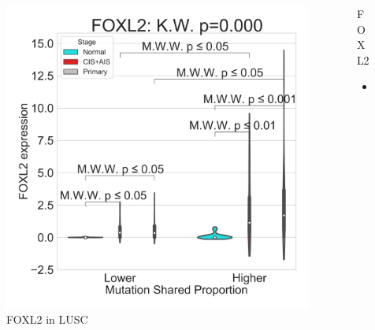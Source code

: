 \documentclass{beamer}
\begin{document}
\begin{frame}[allowframebreaks]
                    \begin{columns}
                        \begin{column}{0.4 \textwidth}
                            \begin{figure}
                                \includegraphics[width=\linewidth]{figures/DEG/Violin/STAR.TPM.SQC.MSP-Median.violin/Mutation Shared Proportion_FOXL2.pdf}
                                \caption{FOXL2 in LUSC}
                            \end{figure}
                        \end{column}
                        \begin{column}{0.55 \textwidth}
                            \begin{block}{FOXL2}
                                \begin{itemize}
                                    \item
                                \end{itemize}
                            \end{block}
                        \end{column}
                    \end{columns}


\end{frame}
\end{document}
